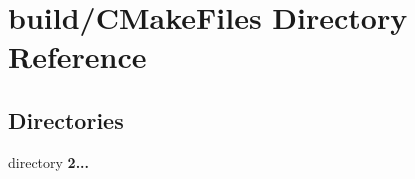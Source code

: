 \section{build/\-C\-Make\-Files Directory Reference}
\label{dir_63772b626f2709090f0bdca0f40827b4}
\subsection*{Directories}
\begin{DoxyCompactItemize}
\item 
directory {\bf 2...}
\end{DoxyCompactItemize}
